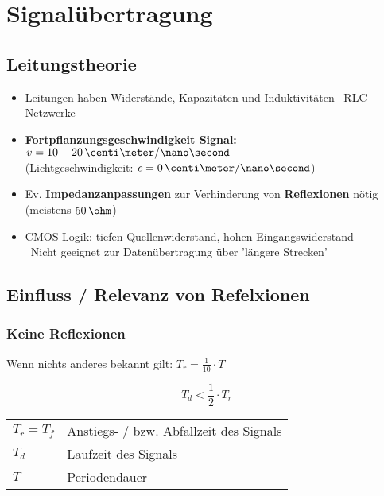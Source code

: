 \section{Signalübertragung}

\subsection{Leitungstheorie}

\begin{itemize}
    \item Leitungen haben Widerstände, Kapazitäten und Induktivitäten \textrightarrow\ RLC-Netzwerke
    \item \textbf{Fortpflanzungsgeschwindigkeit Signal:} $v = 10 - 20 \, \centi \meter / \nano \second$ \\
        (Lichtgeschwindigkeit: $c = 0 \, \centi \meter / \nano \second$)
    \item Ev. \textbf{Impedanzanpassungen} zur Verhinderung von \textbf{Reflexionen} nötig (meistens $50 \, \ohm$)
    \item CMOS-Logik: tiefen Quellenwiderstand, hohen Eingangswiderstand \\
        \textrightarrow\ Nicht geeignet zur Datenübertragung über 'längere Strecken'
\end{itemize}


\subsection{Einfluss / Relevanz von Refelxionen}

\subsubsection{Keine Reflexionen}

Wenn nichts anderes bekannt gilt: $T_r = \frac{1}{10} \cdot T$ 

\begin{minipage}[c]{0.3\columnwidth}
    $$ \boxed{ T_d < \frac{1}{2} \cdot T_r} $$
\end{minipage}
\hfill
\begin{minipage}[c]{0.68\columnwidth}
    \begin{tabular}{ll}
        $T_r = T_f$ & Anstiegs- / bzw. Abfallzeit des Signals \\
        $T_d$       & Laufzeit des Signals \\
        $T$         & Periodendauer
    \end{tabular}
\end{minipage}


